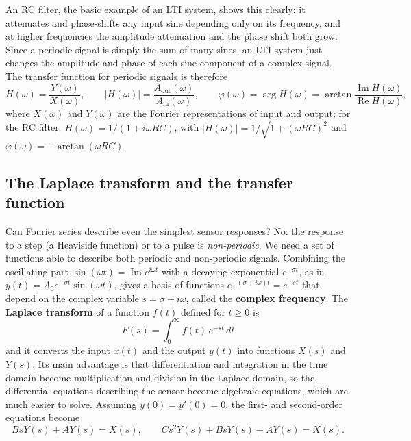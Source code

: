 \documentclass[letterpaper,11pt,leqno]{book}
\begin{document}
An RC filter, the basic example of an LTI system, shows this clearly: it attenuates and phase-shifts any input sine depending only on its frequency, and at higher frequencies the amplitude attenuation and the phase shift both grow. Since a periodic signal is simply the sum of many sines, an LTI system just changes the amplitude and phase of each sine component of a complex signal. The transfer function for periodic signals is therefore
\begin{equation}
H(\omega) = \frac{Y(\omega)}{X(\omega)}, \qquad |H(\omega)| = \frac{A_{\text{out}}(\omega)}{A_{\text{in}}(\omega)}, \qquad \varphi(\omega) = \arg H(\omega) = \arctan\frac{\operatorname{Im}H(\omega)}{\operatorname{Re}H(\omega)},
\label{eq:tf_periodic}
\end{equation}
where $X(\omega)$ and $Y(\omega)$ are the Fourier representations of input and output; for the RC filter, $H(\omega) = 1/(1 + i\omega RC)$, with $|H(\omega)| = 1/\sqrt{1 + (\omega RC)^2}$ and $\varphi(\omega) = -\arctan(\omega RC)$.

\subsection{The Laplace transform and the transfer function}

Can Fourier series describe even the simplest sensor responses? No: the response to a step (a Heaviside function) or to a pulse is \emph{non-periodic}. We need a set of functions able to describe both periodic and non-periodic signals. Combining the oscillating part $\sin(\omega t) = \operatorname{Im}e^{i\omega t}$ with a decaying exponential $e^{-\sigma t}$, as in $y(t) = A_0e^{-\sigma t}\sin(\omega t)$, gives a basis of functions $e^{-(\sigma + i\omega)t} = e^{-st}$ that depend on the complex variable $s = \sigma + i\omega$, called the \textbf{complex frequency}. The \textbf{Laplace transform} of a function $f(t)$ defined for $t \ge 0$ is
\begin{equation}
\boxed{F(s) = \int_0^{\infty}f(t)\,e^{-st}\,dt}
\label{eq:laplace_transform_def}
\end{equation}
and it converts the input $x(t)$ and the output $y(t)$ into functions $X(s)$ and $Y(s)$. Its main advantage is that differentiation and integration in the time domain become multiplication and division in the Laplace domain, so the differential equations describing the sensor become algebraic equations, which are much easier to solve. Assuming $y(0) = y'(0) = 0$, the first- and second-order equations become
\begin{equation}
BsY(s) + AY(s) = X(s), \qquad Cs^2Y(s) + BsY(s) + AY(s) = X(s).
\label{eq:laplace_odes}
\end{equation}
\end{document}
